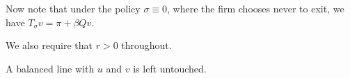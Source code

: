 Now note that under the policy $\sigma
\equiv 0$, where the firm chooses never to exit, we have $T_\sigma v = \pi
+ \beta Q v$.

We also require that $r
> 0$ throughout.

A balanced line with $u$ and $v$ is left untouched.
